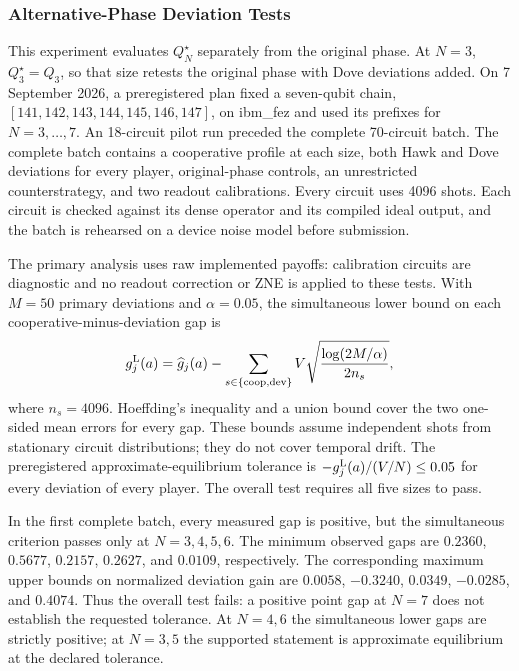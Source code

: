 \subsubsection{Alternative-Phase Deviation Tests}
\label{sec:phase-hardware}
This experiment evaluates $Q_N^\star$ separately from the original
phase. At $N=3$, $Q_3^\star=Q_3$, so that size retests the original phase
with Dove deviations added. On 7 September 2026, a preregistered plan fixed a
seven-qubit chain, $[141,142,143,144,145,146,147]$, on ibm\_fez and used
its prefixes for $N=3,\ldots,7$. An 18-circuit pilot run preceded the
complete 70-circuit batch. The complete batch contains a cooperative profile at
each size, both Hawk and Dove deviations for every player, original-phase
controls, an unrestricted counterstrategy, and two readout calibrations.
Every circuit uses 4096 shots. Each circuit is checked against its dense
operator and its compiled ideal output, and the batch is rehearsed on a
device noise model before submission.

The primary analysis uses raw implemented payoffs: calibration circuits
are diagnostic and no readout correction or ZNE is applied to these tests.
With $M=50$ primary deviations and $\alpha=0.05$, the simultaneous lower
bound on each cooperative-minus-deviation gap is
\begin{equation}
g_j^{\rm L}(a)=\widehat g_j(a)
-\sum_{s\in\{\mathrm{coop},\mathrm{dev}\}}
V\sqrt{\frac{\log(2M/\alpha)}{2n_s}},
\end{equation}
where $n_s=4096$. Hoeffding's inequality and a union bound cover the two
one-sided mean errors for every gap. These bounds assume independent
shots from stationary circuit distributions; they do not cover temporal
drift. The preregistered approximate-equilibrium tolerance is
$-g_j^{\rm L}(a)/(V/N)\le0.05$ for every deviation of every player.
The overall test requires all five sizes to pass.

In the first complete batch, every measured gap is positive, but the
simultaneous criterion passes only at $N=3,4,5,6$. The minimum observed
gaps are $0.2360$, $0.5677$, $0.2157$, $0.2627$, and $0.0109$,
respectively. The corresponding maximum upper bounds on normalized
deviation gain are $0.0058$, $-0.3240$, $0.0349$, $-0.0285$, and
$0.4074$. Thus the overall test fails: a positive point gap
at $N=7$ does not establish the requested tolerance. At $N=4,6$ the
simultaneous lower gaps are strictly positive; at $N=3,5$ the supported
statement is approximate equilibrium at the declared tolerance.

